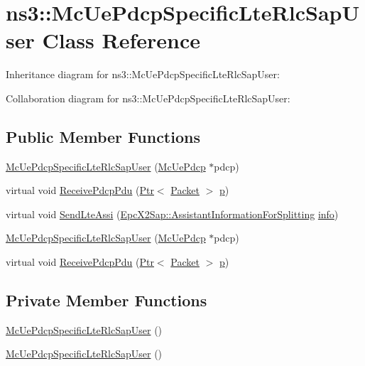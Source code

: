 \hypertarget{classns3_1_1McUePdcpSpecificLteRlcSapUser}{}\section{ns3\+:\+:Mc\+Ue\+Pdcp\+Specific\+Lte\+Rlc\+Sap\+User Class Reference}
\label{classns3_1_1McUePdcpSpecificLteRlcSapUser}


Inheritance diagram for ns3\+:\+:Mc\+Ue\+Pdcp\+Specific\+Lte\+Rlc\+Sap\+User\+:


Collaboration diagram for ns3\+:\+:Mc\+Ue\+Pdcp\+Specific\+Lte\+Rlc\+Sap\+User\+:
\subsection*{Public Member Functions}
\begin{DoxyCompactItemize}
\item 
\hyperlink{classns3_1_1McUePdcpSpecificLteRlcSapUser_a4ca2334accc4128b58dc54e8a14d21aa}{Mc\+Ue\+Pdcp\+Specific\+Lte\+Rlc\+Sap\+User} (\hyperlink{classns3_1_1McUePdcp}{Mc\+Ue\+Pdcp} $\ast$pdcp)
\item 
virtual void \hyperlink{classns3_1_1McUePdcpSpecificLteRlcSapUser_a686f0007338c5f3089d4a802d97a7e94}{Receive\+Pdcp\+Pdu} (\hyperlink{classns3_1_1Ptr}{Ptr}$<$ \hyperlink{classns3_1_1Packet}{Packet} $>$ \hyperlink{lte__link__budget__x2__handover__measures_8m_ac9de518908a968428863f829398a4e62}{p})
\item 
virtual void \hyperlink{classns3_1_1McUePdcpSpecificLteRlcSapUser_a6914bc2f13dac5b835836a31e2e4f955}{Send\+Lte\+Assi} (\hyperlink{structns3_1_1EpcX2Sap_1_1AssistantInformationForSplitting}{Epc\+X2\+Sap\+::\+Assistant\+Information\+For\+Splitting} \hyperlink{classns3_1_1LteRlcSapUser_ae5c93c1d5c538c4f8cec3ad4ecbd898a}{info})
\item 
\hyperlink{classns3_1_1McUePdcpSpecificLteRlcSapUser_a4ca2334accc4128b58dc54e8a14d21aa}{Mc\+Ue\+Pdcp\+Specific\+Lte\+Rlc\+Sap\+User} (\hyperlink{classns3_1_1McUePdcp}{Mc\+Ue\+Pdcp} $\ast$pdcp)
\item 
virtual void \hyperlink{classns3_1_1McUePdcpSpecificLteRlcSapUser_ae8b46bb1b02fe338ef6b9c67b77ff03c}{Receive\+Pdcp\+Pdu} (\hyperlink{classns3_1_1Ptr}{Ptr}$<$ \hyperlink{classns3_1_1Packet}{Packet} $>$ \hyperlink{lte__link__budget__x2__handover__measures_8m_ac9de518908a968428863f829398a4e62}{p})
\end{DoxyCompactItemize}
\subsection*{Private Member Functions}
\begin{DoxyCompactItemize}
\item 
\hyperlink{classns3_1_1McUePdcpSpecificLteRlcSapUser_adb7fed47998e9f9e5469c06f761c85a8}{Mc\+Ue\+Pdcp\+Specific\+Lte\+Rlc\+Sap\+User} ()
\item 
\hyperlink{classns3_1_1McUePdcpSpecificLteRlcSapUser_adb7fed47998e9f9e5469c06f761c85a8}{Mc\+Ue\+Pdcp\+Specific\+Lte\+Rlc\+Sap\+User} ()
\end{DoxyCompactItemize}

